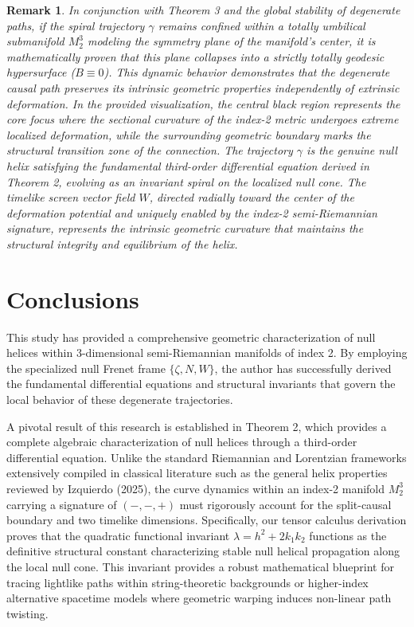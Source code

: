 \documentclass [reqno]{amsart}
\theoremstyle{plain}
\newtheorem{remark}{Remark}
\numberwithin{equation}{section}
\begin{document}
\begin{remark}
In conjunction with Theorem 3 and the global stability of degenerate paths, if the spiral trajectory $\gamma$ remains confined within a totally umbilical submanifold $M_2^3$ modeling the symmetry plane of the manifold’s center, it is mathematically proven that this plane collapses into a strictly totally geodesic hypersurface ($B\equiv 0$). This dynamic behavior demonstrates that the degenerate causal path preserves its intrinsic geometric properties independently of extrinsic deformation. In the provided visualization, the central black region represents the core focus where the sectional curvature of the index-2 metric undergoes extreme localized deformation, while the surrounding geometric boundary marks the structural transition zone of the connection. The trajectory $\gamma$ is the genuine null helix satisfying the fundamental third-order differential equation derived in Theorem 2, evolving as an invariant spiral on the localized null cone. The timelike screen vector field $W$, directed radially toward the center of the deformation potential and uniquely enabled by the index-2 semi-Riemannian signature, represents the intrinsic geometric curvature that maintains the structural integrity and equilibrium of the helix.
\end{remark}

\section{Conclusions}

This study has provided a comprehensive geometric characterization of null helices within 3-dimensional semi-Riemannian manifolds of index 2. By employing the specialized null Frenet frame $\{\zeta,N,W\}$, the author has successfully derived the fundamental differential equations and structural invariants that govern the local behavior of these degenerate trajectories.

A pivotal result of this research is established in Theorem 2, which provides a complete algebraic characterization of null helices through a third-order differential equation. Unlike the standard Riemannian and Lorentzian frameworks extensively compiled in classical literature such as the general helix properties reviewed by Izquierdo (2025), the curve dynamics within an index-2 manifold $M_2^3$ carrying a signature of $(-,-,+)$ must rigorously account for the split-causal boundary and two timelike dimensions. Specifically, our tensor calculus derivation proves that the quadratic functional invariant $\lambda=h^2+2k_1 k_2$ functions as the definitive structural constant characterizing stable null helical propagation along the local null cone. This invariant provides a robust mathematical blueprint for tracing lightlike paths within string-theoretic backgrounds or higher-index alternative spacetime models where geometric warping induces non-linear path twisting.
\end{document}
